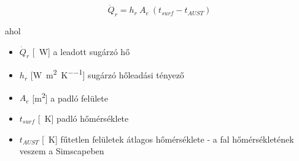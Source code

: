 \begin{equation} \label{eq_radiative_hr_linear}
\dot Q_{r} = h_r ~ A_e ~ \left(t_{surf}-t_{AUST}\right)
\end{equation}

ahol
\begin{itemize}[itemsep=3pt,topsep=0pt,parsep=0pt,partopsep=0pt]
	\item[] $\dot{Q}_{r}$ [\SI{}{\watt}] a leadott sugárzó hő
	\item[] $h_r$ [\si[per-mode = fraction]{\watt\per\meter\squared\per\kelvin}] sugárzó hőleadási tényező
	\item[] $A_e$ [\si{\metre\squared}] a padló felülete
	\item[] $t_{surf}$ [\SI{}{\kelvin}] padló hőmérséklete
	\item[] $t_{AUST}$ [\SI{}{\kelvin}] fűtetlen felületek átlagos hőmérséklete - a fal hőmérsékletének veszem a Simscapeben
\end{itemize}


\newpage

